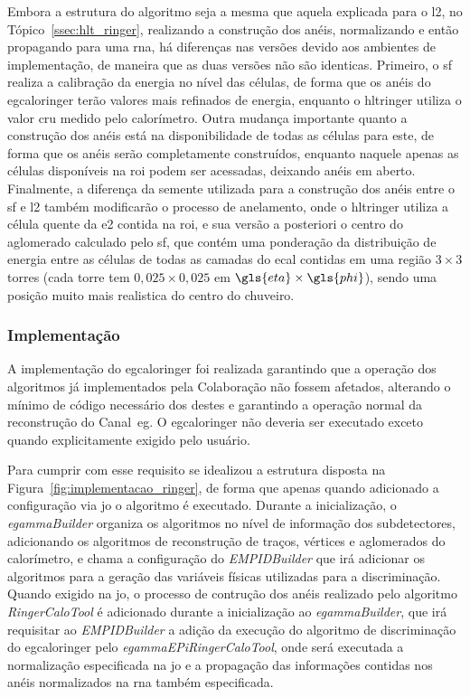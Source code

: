 Embora a estrutura do algoritmo seja a mesma que aquela explicada para o \gls{l2}, no
Tópico~\ref{ssec:hlt_ringer}, realizando a construção dos anéis, normalizando e
então propagando para uma \gls{rna}, há diferenças nas versões devido aos ambientes de implementação, 
de maneira que as duas versões não são identicas. Primeiro, o \gls{sf} realiza a calibração da energia 
no nível das células, de forma que os anéis do \gls{egcaloringer} terão 
valores mais refinados de energia, enquanto o \gls{hltringer} utiliza o
valor cru medido pelo calorímetro. Outra mudança importante quanto a construção
dos anéis está na disponibilidade de todas as células para este, de forma que
os anéis serão completamente construídos, enquanto naquele apenas as
células disponíveis na \gls{roi} podem ser acessadas, deixando anéis em aberto. 
Finalmente, a diferença da semente utilizada para a construção dos anéis entre o \gls{sf} e \gls{l2}
também modificarão o processo de anelamento, onde o \gls{hltringer} utiliza
a célula quente da \gls{e2} contida na \gls{roi}, e sua versão a
posteriori o centro do aglomerado calculado pelo \gls{sf}, que contém uma ponderação da
distribuição de energia entre as células de todas as camadas do \gls{ecal}
contidas em uma região $3\times3$ torres (cada torre tem $0,025\times0,025$ em
$\gls{eta}\times\gls{phi}$), sendo uma posição muito mais realistica 
do centro do chuveiro.


\subsubsection{Implementação}
\label{sssec:egringer_impl}

A implementação do \gls{egcaloringer} foi realizada garantindo que a operação
dos algoritmos já implementados pela Colaboração não fossem afetados, alterando
o mínimo de código necessário dos destes e garantindo a operação normal da
reconstrução do Canal~\gls{eg}. O \gls{egcaloringer} não deveria ser executado
exceto quando explicitamente exigido pelo usuário. 

Para cumprir com esse requisito se idealizou a 
estrutura disposta na Figura~\ref{fig:implementacao_ringer}, de forma que apenas
quando adicionado a configuração via \glsdesc{jo} o algoritmo é executado.
Durante a inicialização, o \emph{egammaBuilder} organiza os algoritmos no
nível de informação dos subdetectores, adicionando os algoritmos de reconstrução
de traços, vértices e aglomerados do calorímetro, e chama a configuração do
\emph{EMPIDBuilder} que irá adicionar os algoritmos para a geração das variáveis
físicas utilizadas para a discriminação. Quando exigido na \glsdesc{jo}, o
processo de contrução dos anéis realizado pelo algoritmo \emph{RingerCaloTool} 
é adicionado durante a inicialização ao \emph{egammaBuilder}, 
que irá requisitar ao \emph{EMPIDBuilder} a adição da
execução do algoritmo de discriminação do \gls{egcaloringer} pelo
\emph{egammaEPiRingerCaloTool}, onde será executada a normalização especificada 
na \glsdesc{jo} e a propagação das informações contidas nos anéis normalizados 
na \gls{rna} também especificada. 

